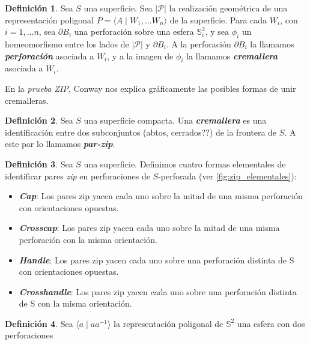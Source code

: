 \documentclass[10pt]{report}
\newcommand{\Esfera}{\mathbb{S}^2}
\newcommand{\enfatiza}[1]{\textbf{\textit{#1}}}
\theoremstyle{definition}
\newtheorem{defin}{Definición}[section]
\begin{document}
\begin{defin}%
Sea $S$ una superficie. Sea $|\mathcal{P}|$ la realización geométrica de una representación poligonal $P=\langle A\mid W_1,\dots W_n\rangle$ de la superficie. Para cada $W_i$, con $i=1,\dots n$, sea $\partial B_i$ una perforación sobre una esfera $\Esfera_i$, y sea $\phi _i$ un homeomorfismo entre los lados de $|\mathcal{P}|$ y $\partial B_i$. A la perforación $\partial B_i$ la llamamos \enfatiza{perforación} asociada a $W_i$, y a la imagen de $\phi _i$ la llamamos \enfatiza{cremallera} asociada a $W_i$.
\end{defin}

En la \textit{prueba ZIP}, Conway nos explica gráficamente las posibles formas de unir cremalleras. 

\begin{defin}%
Sea $S$ una superficie compacta. Una \enfatiza{cremallera} es una identificación entre dos subconjuntos (abtos, cerrados??) de la frontera de $S$. A este par lo llamamos \enfatiza{par-zip}.
\end{defin}

\begin{defin}
Sea $S$ una superficie. Definimos cuatro formas elementales de identificar pares \textit{zip} en perforaciones de 
$S$-perforada (ver \autoref{fig:zip_elementales}):

\begin{itemize}
\item[1.] \enfatiza{Cap}: Los pares zip yacen cada uno sobre la mitad de una misma perforación con orientaciones opuestas.
\item[2.] \enfatiza{Crosscap}: Los pares zip yacen cada uno sobre la mitad de una misma perforación con la misma orientación.
\item[3.] \enfatiza{Handle}: Los pares zip yacen cada uno sobre una perforación distinta de S con orientaciones opuestas.
\item[4.] \enfatiza{Crosshandle}: Los pares zip yacen cada uno sobre una perforación distinta de S con la misma orientación.
\end{itemize}
\end{defin}
\begin{defin}
Sea $\langle a\mid aa^{-1}\rangle$ la representación poligonal de  $\Esfera$ una esfera con dos perforaciones 
\end{defin}
\end{document}
